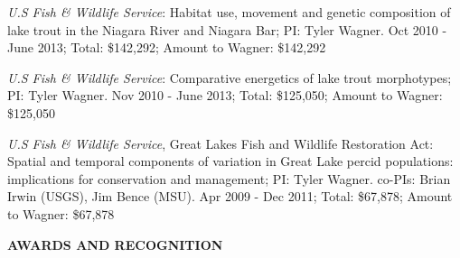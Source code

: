 \documentclass[10pt]{article}
\begin{document}
\begin{flushleft}
\begin{etaremune}
\item {\sl U.S Fish \& Wildlife Service}: Habitat use, movement and genetic composition of lake trout in the Niagara River and Niagara Bar; PI: Tyler Wagner. Oct 2010 - June 2013; Total: \$142,292;  Amount to Wagner: \$142,292

\item  {\sl U.S Fish \& Wildlife Service}: Comparative energetics of lake trout morphotypes; PI: Tyler Wagner. Nov 2010 - June 2013; Total: \$125,050; Amount to Wagner:  \$125,050

\item  {\sl U.S Fish \& Wildlife Service}, Great Lakes Fish and Wildlife Restoration Act: Spatial and temporal components of variation in Great Lake percid populations: implications for conservation and management; PI: Tyler Wagner. co-PIs: Brian Irwin (USGS), Jim Bence (MSU). Apr 2009 - Dec 2011; Total: \$67,878; Amount to Wagner: \$67,878
\end{etaremune}


\centerline {\bf{AWARDS AND RECOGNITION}}


\end{flushleft}
\end{document}
